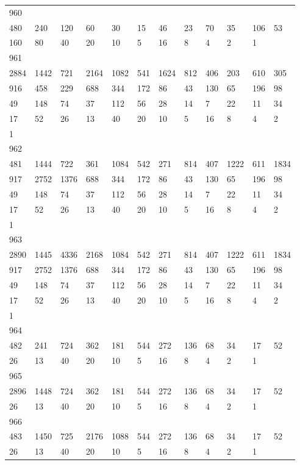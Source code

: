 \begin{longtable}{llllllllllll}
960&&&&&&&&&&&\\
480& 240& 120& 60& 30& 15& 46& 23& 70& 35& 106& 53\\
160& 80& 40& 20& 10& 5& 16& 8& 4& 2& 1& \\

961&&&&&&&&&&&\\
2884& 1442& 721& 2164& 1082& 541& 1624& 812& 406& 203& 610& 305\\
916& 458& 229& 688& 344& 172& 86& 43& 130& 65& 196& 98\\
49& 148& 74& 37& 112& 56& 28& 14& 7& 22& 11& 34\\
17& 52& 26& 13& 40& 20& 10& 5& 16& 8& 4& 2\\
1& \\

962&&&&&&&&&&&\\
481& 1444& 722& 361& 1084& 542& 271& 814& 407& 1222& 611& 1834\\
917& 2752& 1376& 688& 344& 172& 86& 43& 130& 65& 196& 98\\
49& 148& 74& 37& 112& 56& 28& 14& 7& 22& 11& 34\\
17& 52& 26& 13& 40& 20& 10& 5& 16& 8& 4& 2\\
1& \\

963&&&&&&&&&&&\\
2890& 1445& 4336& 2168& 1084& 542& 271& 814& 407& 1222& 611& 1834\\
917& 2752& 1376& 688& 344& 172& 86& 43& 130& 65& 196& 98\\
49& 148& 74& 37& 112& 56& 28& 14& 7& 22& 11& 34\\
17& 52& 26& 13& 40& 20& 10& 5& 16& 8& 4& 2\\
1& \\

964&&&&&&&&&&&\\
482& 241& 724& 362& 181& 544& 272& 136& 68& 34& 17& 52\\
26& 13& 40& 20& 10& 5& 16& 8& 4& 2& 1& \\

965&&&&&&&&&&&\\
2896& 1448& 724& 362& 181& 544& 272& 136& 68& 34& 17& 52\\
26& 13& 40& 20& 10& 5& 16& 8& 4& 2& 1& \\

966&&&&&&&&&&&\\
483& 1450& 725& 2176& 1088& 544& 272& 136& 68& 34& 17& 52\\
26& 13& 40& 20& 10& 5& 16& 8& 4& 2& 1& \\


\end{longtable}
